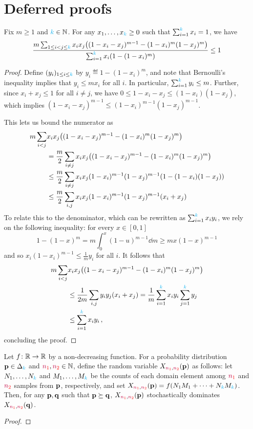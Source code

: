\section{Deferred proofs}
  \label{sec:deferred:chap:identity}
\begin{lemma}
Fix $m \geq 1$ and ${\textcolor{cyan}{k}} \in \mathbb{N}$. For any $x_1,\dots,x_{\textcolor{cyan}{k}} \geq 0$ such that $\sum_{i=1}^{\textcolor{cyan}{k}} x_i = 1$, we have
\[
    \frac{m\sum_{1\leq i < j \leq \ab} x_i x_j \Paren{ (1-x_i - x_j)^{m-1} - (1-x_i)^m(1-x_j)^m} }{\sum_{i=1}^\ab x_i (1-(1-x_i)^m)} \leq 1
\]
\end{lemma}
\begin{proof}
Define $(y_i)_{1\leq i\leq {\textcolor{cyan}{k}}}$ by $y_i \eqdef 1-(1-x_i)^m$, and note that Bernoulli's inequality implies that $y_i \leq m x_i$ for all $i$. In particular, $\sum_{i=1}^{\textcolor{cyan}{k}} y_i \leq m$. Further, since $x_i + x_j \leq 1$ for all $i\neq j$, we have $0 \leq 1-x_i -x_j \leq (1-x_i)(1-x_j)$, which implies $(1-x_i -x_j)^{m-1} \leq (1-x_i)^{m-1}(1-x_j)^{m-1}$.

This lets us bound the numerator as
\begin{align*}
m\sum_{i < j} &x_i x_j \Paren{ (1-x_i - x_j)^{m-1} - (1-x_i)^m(1-x_j)^m} \\
&= \frac{m}{2}\sum_{i \neq j} x_i x_j \Paren{ (1-x_i - x_j)^{m-1} - (1-x_i)^m(1-x_j)^m} \\
&\leq \frac{m}{2}\sum_{i \neq j} x_i x_j (1-x_i)^{m-1}(1-x_j)^{m-1} \Paren{ 1 - (1-x_i)(1-x_j)} \\
&\leq \frac{m}{2}\sum_{i, j} x_i x_j (1-x_i)^{m-1}(1-x_j)^{m-1} \Paren{x_i+x_j}
\end{align*}
To relate this to the denominator, which can be rewritten as $\sum_{i=1}^{\textcolor{cyan}{k}} x_i y_i$, we rely on the following inequality: for every $x\in[0,1]$
\[
1-(1-x)^m = m\int_{0}^x (1-u)^{m-1} \dd{m} \geq m x (1-x)^{m-1}
\]
and so $x_i (1-x_i)^{m-1} \leq \frac{1}{m}y_i$ for all $i$. It follows that
\begin{align*}
m\sum_{i < j} &x_i x_j \Paren{ (1-x_i - x_j)^{m-1} - (1-x_i)^m(1-x_j)^m} \\
&\leq \frac{1}{2m}\sum_{i, j} y_i y_j \Paren{x_i+x_j} 
= \frac{1}{m}\sum_{i=1}^\ab x_i y_i \sum_{j=1}^\ab y_j \\
&\leq \sum_{i=1}^\ab x_i y_i\,,
\end{align*}
concluding the proof.
\end{proof}

\begin{theorem}
  Let $f\colon \mathbb{R}\to\mathbb{R}$ by a non-decreasing function. For a probability distribution $\mathbf{p}\in\Delta_{{\textcolor{cyan}{k}}}$ and $\textcolor{red}{{\textcolor{purple}{n}}_1},\textcolor{red}{{\textcolor{purple}{n}}_2}\in\mathbb{N}$, define the random variable $X_{\textcolor{red}{{\textcolor{purple}{n}}_1},\textcolor{red}{{\textcolor{purple}{n}}_2}}(\mathbf{p})$ as follows: let $N_1,\dots,N_{\textcolor{cyan}{k}}$ and $M_1,\dots,M_{\textcolor{cyan}{k}}$ be the counts of each domain element among $\textcolor{red}{{\textcolor{purple}{n}}_1}$ and $\textcolor{red}{{\textcolor{purple}{n}}_2}$ \iid samples from $\mathbf{p}$, respectively, and set $X_{\textcolor{red}{{\textcolor{purple}{n}}_1},\textcolor{red}{{\textcolor{purple}{n}}_2}}(\mathbf{p})=f(N_1M_1+\dots+N_{\textcolor{cyan}{k}} M_{\textcolor{cyan}{k}})$. Then, for any $\mathbf{p},\mathbf{q}$ such that $\mathbf{p}\succeq\mathbf{q}$, $X_{\textcolor{red}{{\textcolor{purple}{n}}_1},\textcolor{red}{{\textcolor{purple}{n}}_2}}(\mathbf{p})$ stochastically dominates $X_{\textcolor{red}{{\textcolor{purple}{n}}_1},\textcolor{red}{{\textcolor{purple}{n}}_2}}(\mathbf{q})$.
\end{theorem}
\begin{proof}
\end{proof}

